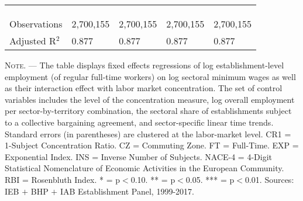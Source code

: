 \documentclass[11pt,oneside,reqno,xcolor=dvipsnames]{article} %
\begin{document}
\begin{appendix}
\begin{refsection}
\begin{landscape}
\begin{table}[!ht]
{\begin{threeparttable}
\begin{tabular}{|C{4cm}|C{2.7cm}C{2.7cm}C{2.7cm}C{2.7cm}|}
&&&& \\
&&&& \\[0.2cm] \hdashline
&&&& \\[-0.2cm]
Observations &  2,700,155    & 2,700,155    & 2,700,155    & 2,700,155      \\[0.2cm]
Adjusted R$^2$ &  0.877    & 0.877    &   0.877   &   0.877      \\[0.2cm] \hline \hline
\end{tabular}
\begin{tablenotes}
\item \footnotesize \textsc{Note. ---} The table displays fixed effects regressions of log establishment-level employment (of regular full-time workers) on log sectoral minimum wages as well as their interaction effect with labor market concentration. The set of control variables includes the level of the concentration measure, log overall employment per sector-by-territory combination, the sectoral share of establishments subject to a collective bargaining agreement, and sector-specific linear time trends. Standard errors (in parentheses) are clustered at the labor-market level. CR1 = 1-Subject Concentration Ratio. CZ = Commuting Zone. FT = Full-Time. EXP = Exponential Index. INS = Inverse Number of Subjects. NACE-4 = 4-Digit Statistical Nomenclature of Economic Activities in the European Community. RBI = Rosenbluth Index. * = p$<$0.10. ** = p$<$0.05. *** = p$<$0.01. Sources: IEB $\plus$ BHP $\plus$ IAB Establishment Panel, 1999-2017.
\end{tablenotes}
\end{threeparttable}
}
\end{table}



\clearpage
\vspace*{\fill}



\end{landscape}
\end{refsection}
\end{appendix}
\end{document}
